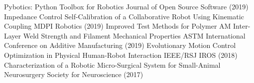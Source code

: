 \documentclass[11pt, letterpaper]{awesome-cv}
\begin{document}
\begin{cvhonors}
    \cvhonor
    {Pybotics: Python Toolbox for Robotics}
    {Journal of Open Source Software (2019)}
    {}
    {}
    \cvhonor
    {Impedance Control Self-Calibration of a Collaborative Robot Using Kinematic Coupling}
    {MDPI Robotics (2019)}
    {}
    {}
    \cvhonor
    {Improved Test Methods for Polymer AM Inter-Layer Weld Strength and Filament Mechanical Properties}
    {ASTM International Conference on Additive Manufacturing (2019)}
    {}
    {}
    \cvhonor
    {Evolutionary Motion Control Optimization in Physical Human-Robot Interaction}
    {IEEE/RSJ IROS (2018)}
    {}
    {}
    \cvhonor
    {Characterization of a Robotic Micro-Surgical System for Small-Animal Neurosurgery}
    {Society for Neuroscience (2017)}
    {}
    {}
\end{cvhonors}
\end{document}
